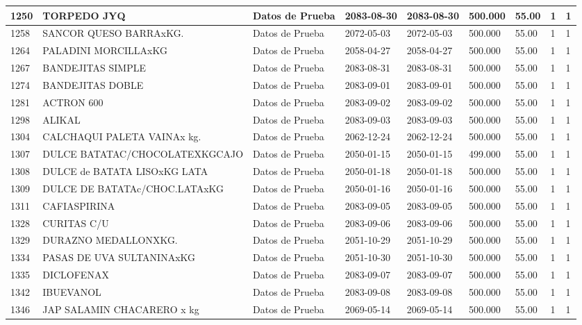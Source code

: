 \documentclass[a4paper,12pt]{article}
\begin{document}
\begin{landscape}
\begin{longtable}{|p{4cm}|p{2.5cm}|p{2.5cm}|p{1.8cm}|p{1.8cm}|p{1cm}|p{1cm}|p{3cm}|p{3cm}||}
1250 & TORPEDO JYQ & Datos de Prueba & 2083-08-30 & 2083-08-30 & 500.000 & 55.00 & 1 & 1 \\ \hline 
1258 & SANCOR QUESO BARRAxKG. & Datos de Prueba & 2072-05-03 & 2072-05-03 & 500.000 & 55.00 & 1 & 1 \\ \hline 
1264 & PALADINI MORCILLAxKG & Datos de Prueba & 2058-04-27 & 2058-04-27 & 500.000 & 55.00 & 1 & 1 \\ \hline 
1267 & BANDEJITAS SIMPLE & Datos de Prueba & 2083-08-31 & 2083-08-31 & 500.000 & 55.00 & 1 & 1 \\ \hline 
1274 & BANDEJITAS DOBLE & Datos de Prueba & 2083-09-01 & 2083-09-01 & 500.000 & 55.00 & 1 & 1 \\ \hline 
1281 & ACTRON 600 & Datos de Prueba & 2083-09-02 & 2083-09-02 & 500.000 & 55.00 & 1 & 1 \\ \hline 
1298 & ALIKAL & Datos de Prueba & 2083-09-03 & 2083-09-03 & 500.000 & 55.00 & 1 & 1 \\ \hline 
1304 & CALCHAQUI PALETA VAINAx kg. & Datos de Prueba & 2062-12-24 & 2062-12-24 & 500.000 & 55.00 & 1 & 1 \\ \hline 
1307 & DULCE BATATAC/CHOCOLATEXKGCAJO & Datos de Prueba & 2050-01-15 & 2050-01-15 & 499.000 & 55.00 & 1 & 1 \\ \hline 
1308 & DULCE de BATATA LISOxKG LATA & Datos de Prueba & 2050-01-18 & 2050-01-18 & 500.000 & 55.00 & 1 & 1 \\ \hline 
1309 & DULCE DE BATATAc/CHOC.LATAxKG & Datos de Prueba & 2050-01-16 & 2050-01-16 & 500.000 & 55.00 & 1 & 1 \\ \hline 
1311 & CAFIASPIRINA & Datos de Prueba & 2083-09-05 & 2083-09-05 & 500.000 & 55.00 & 1 & 1 \\ \hline 
1328 & CURITAS C/U & Datos de Prueba & 2083-09-06 & 2083-09-06 & 500.000 & 55.00 & 1 & 1 \\ \hline 
1329 & DURAZNO MEDALLONXKG. & Datos de Prueba & 2051-10-29 & 2051-10-29 & 500.000 & 55.00 & 1 & 1 \\ \hline 
1334 & PASAS DE UVA SULTANINAxKG & Datos de Prueba & 2051-10-30 & 2051-10-30 & 500.000 & 55.00 & 1 & 1 \\ \hline 
1335 & DICLOFENAX & Datos de Prueba & 2083-09-07 & 2083-09-07 & 500.000 & 55.00 & 1 & 1 \\ \hline 
1342 & IBUEVANOL & Datos de Prueba & 2083-09-08 & 2083-09-08 & 500.000 & 55.00 & 1 & 1 \\ \hline 
1346 & JAP SALAMIN CHACARERO x kg & Datos de Prueba & 2069-05-14 & 2069-05-14 & 500.000 & 55.00 & 1 & 1 \\ \hline 

\end{longtable}
\end{landscape}
\end{document}
